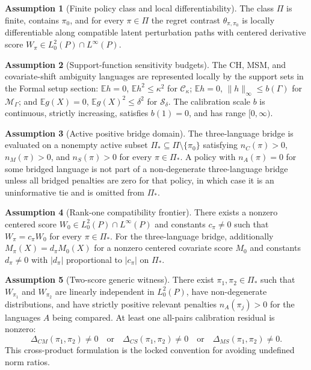 \documentclass[11pt]{article}
\newcommand{\E}{\mathbb{E}}
\theoremstyle{definition}
\newtheorem{assumption}{Assumption}
\theoremstyle{plain}
\theoremstyle{remark}
\begin{document}
\begin{assumption}[Finite policy class and local differentiability]\label{ass:finite-local}
The class $\Pi$ is finite, contains $\pi_0$, and for every $\pi\in\Pi$ the regret
contrast $\theta_{\pi,\pi_0}$ is locally differentiable along compatible latent
perturbation paths with centered derivative score
$W_\pi\in L^2_0(P)\cap L^\infty(P)$.
\end{assumption}

\begin{assumption}[Support-function sensitivity budgets]\label{ass:support-budgets}
The CH, MSM, and covariate-shift ambiguity languages are represented locally by
the support sets in the Formal setup section: $\E h=0$, $\E h^2\le\kappa^2$ for
$\mathcal C_{\kappa}$; $\E h=0$, $\|h\|_{\infty}\le b(\Gamma)$ for
$\mathcal M_{\Gamma}$; and $\E g(X)=0$, $\E g(X)^2\le\delta^2$ for
$\mathcal S_{\delta}$.  The calibration scale $b$ is continuous, strictly
increasing, satisfies $b(1)=0$, and has range $[0,\infty)$.
\end{assumption}

\begin{assumption}[Active positive bridge domain]\label{ass:active-domain}
The three-language bridge is evaluated on a nonempty active subset
$\Pi_\ast\subseteq\Pi\setminus\{\pi_0\}$ satisfying
$n_C(\pi)>0$, $n_M(\pi)>0$, and $n_S(\pi)>0$ for every $\pi\in\Pi_\ast$.
A policy with $n_A(\pi)=0$ for some bridged language is not part of a
non-degenerate three-language bridge unless all bridged penalties are zero for
that policy, in which case it is an uninformative tie and is omitted from
$\Pi_\ast$.
\end{assumption}

\begin{assumption}[Rank-one compatibility frontier]\label{ass:rank-one}
There exists a nonzero centered score $W_0\in L^2_0(P)\cap L^{\infty}(P)$ and
constants $c_{\pi}\ne0$ such that $W_{\pi}=c_{\pi}W_0$ for every
$\pi\in\Pi_\ast$.  For the three-language bridge, additionally
$M_{\pi}(X)=d_{\pi}M_0(X)$ for a nonzero centered covariate score $M_0$ and
constants $d_{\pi}\ne0$ with $|d_{\pi}|$ proportional to $|c_{\pi}|$ on
$\Pi_\ast$.
\end{assumption}

\begin{assumption}[Two-score generic witness]\label{ass:two-score}
There exist $\pi_1,\pi_2\in\Pi_\ast$ such that $W_{\pi_1}$ and $W_{\pi_2}$ are
linearly independent in $L^2_0(P)$, have non-degenerate distributions, and have
strictly positive relevant penalties $n_A(\pi_j)>0$ for the languages $A$ being
compared.  At least one all-pairs calibration residual is nonzero:
\[
  \Delta_{CM}(\pi_1,\pi_2)\ne0
  \quad\text{or}\quad
  \Delta_{CS}(\pi_1,\pi_2)\ne0
  \quad\text{or}\quad
  \Delta_{MS}(\pi_1,\pi_2)\ne0.
\]
This cross-product formulation is the locked convention for avoiding undefined
norm ratios.
\end{assumption}
\end{document}

